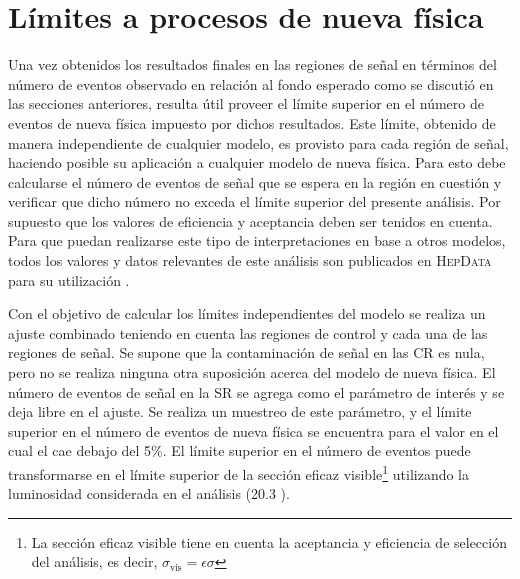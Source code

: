 

\clearpage


\section{Límites a procesos de nueva física} \label{sec:model_independent}

Una vez obtenidos los resultados finales en las regiones de señal en términos
del número de eventos observado en relación al fondo esperado como se discutió
en las secciones anteriores, resulta útil proveer el límite superior en el número de eventos de
nueva física impuesto por dichos resultados. Este límite, obtenido de manera independiente de cualquier modelo,
es provisto para cada región de señal, haciendo posible su aplicación a cualquier modelo de
nueva física. Para esto debe calcularse
el número de eventos de señal que se espera
en la región en cuestión y verificar que dicho número no exceda el límite
superior del presente análisis. Por supuesto que los valores de eficiencia y aceptancia deben ser
tenidos en cuenta.
Para que puedan realizarse este tipo de interpretaciones en base a otros modelos, todos
los valores y datos relevantes de este análisis son publicados en \textsc{HepData}
para su utilización \cite{hepdata}.

Con el objetivo de calcular los límites independientes del modelo se realiza un
ajuste combinado teniendo en cuenta las regiones de control y cada una de las
regiones de señal. Se supone que la contaminación de señal en las CR es nula,
pero no se realiza ninguna otra suposición acerca del modelo de nueva física. El
número de eventos de señal en la SR se agrega como el parámetro de interés y se
deja libre en el ajuste. Se realiza un muestreo de este parámetro, y el
límite superior en el número de eventos de nueva física se encuentra para el
valor en el cual el {\cls} cae debajo del 5\%. El límite superior en el número
de eventos puede transformarse en el límite superior de la sección eficaz
visible\footnote{La sección eficaz visible tiene en cuenta
  la aceptancia y eficiencia de selección del análisis, es decir, $\sigma_{\text{vis}} = \epsilon\sigma$}
utilizando la luminosidad considerada en el análisis
(20.3 \ifb).


